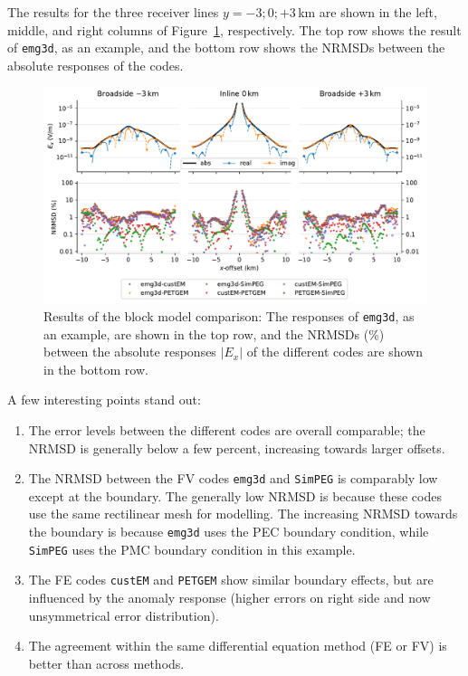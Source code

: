 \documentclass[onecolumn,extra,camera]{gji}
\newcommand{\emg}[2]{\texttt{emg#1#2}\xspace}
\newcommand{\simpeg}{\texttt{SimPEG}\xspace}
\newcommand{\custem}{\texttt{custEM}\xspace}
\newcommand{\petgem}{\texttt{PETGEM}\xspace}
\begin{document}
The results for the three receiver lines $y=-3;0;+3\,$km are shown in the left, middle, and right columns of Figure~\ref{fig:results-block}, respectively. The top row shows the result of \emg3d, as an example, and the bottom row shows the NRMSDs between the absolute responses of the codes.
%
\begin{figure}
  \centering
  \includegraphics[width=.9\linewidth]{figures/results-block}
  \caption{Results of the block model comparison: The responses of \emg3d, as an example, are shown in the top row, and the NRMSDs (\%) between the absolute responses $|E_x|$ of the different codes are shown in the bottom row.}
  \label{fig:results-block}
\end{figure}
%

A few interesting points stand out:
\begin{enumerate}
  \item The error levels between the different codes are overall comparable; the NRMSD is generally below a few percent, increasing towards larger offsets.
  \item The NRMSD between the FV codes \emg3d and \simpeg is comparably low except at the boundary. The generally low NRMSD is because these codes use the same rectilinear mesh for modelling. The increasing NRMSD towards the boundary is because \emg3d uses the PEC boundary condition, while \simpeg uses the PMC boundary condition in this example.
  \item The FE codes \custem and \petgem show similar boundary effects, but are influenced by the anomaly response (higher errors on right side and now unsymmetrical error distribution).
  \item The agreement within the same differential equation method (FE or FV) is better than across methods.
\end{enumerate}
\end{document}
